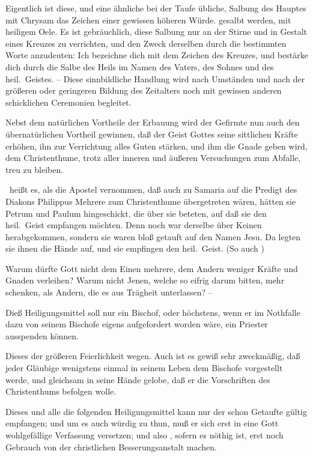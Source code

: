 \begin{aufza}
{	Eigentlich ist diese, und eine ähnliche bei der Taufe übliche, Salbung des Hauptes mit Chrysam das Zeichen einer gewissen höheren Würde.}
gesalbt werden, mit heiligem Oele. Es ist gebräuchlich, diese Salbung nur an der Stirne und in Gestalt eines Kreuzes zu verrichten, und den Zweck derselben durch die bestimmten Worte anzudeuten: Ich bezeichne dich mit dem Zeichen des Kreuzes, und bestärke dich durch die Salbe des Heils im Namen des Vaters, des Sohnes und des heil.\ Geistes. -- Diese sinnbildliche Handlung wird nach Umständen und nach der größeren oder geringeren Bildung des Zeitalters noch mit gewissen anderen schicklichen Ceremonien begleitet.
\item Nebst dem natürlichen Vortheile der Erbauung wird der Gefirmte nun auch den übernatürlichen Vortheil gewinnen, daß der Geist Gottes seine sittlichen Kräfte erhöhen, ihn zur Verrichtung alles Guten stärken, und ihm die Gnade geben wird, dem Christenthume, trotz aller inneren und äußeren Versuchungen zum Abfalle, treu zu bleiben.~\par
{}\par
{}\ heißt es, als die Apostel vernommen, daß auch zu Samaria auf die Predigt des Diakons Philippus Mehrere zum Christenthume übergetreten wären, hätten sie Petrum und Paulum hingeschickt, die über sie beteten, auf daß sie den heil.\ Geist empfangen möchten. Denn noch war derselbe über Keinen herabgekommen, sondern sie waren bloß getauft auf den Namen Jesu. Da legten sie ihnen die Hände auf, und sie empfingen den heil.\ Geist. (So auch )\par
{}\par
Warum dürfte Gott nicht dem Einen mehrere, dem Andern weniger Kräfte und Gnaden verleihen? Warum nicht Jenen, welche so eifrig darum bitten, mehr schenken, als Andern, die es aus Trägheit unterlassen? --
\item Dieß Heiligungsmittel soll nur ein Bischof, oder höchstens, wenn er im Nothfalle dazu von seinem Bischofe eigens aufgefordert worden wäre, ein Priester ausspenden können.\par
{}\par
Dieses der größeren Feierlichkeit wegen. Auch ist es gewiß sehr zweckmäßig, daß jeder Gläubige wenigstens einmal in seinem Leben dem Bischofe vorgestellt werde, und gleichsam in seine Hände gelobe, daß er die Vorschriften des Christenthums befolgen wolle.
\item Dieses und alle die folgenden Heiligungsmittel kann nur der schon Getaufte gültig empfangen; und um es auch würdig zu thun, muß er sich erst in eine Gott wohlgefällige Verfassung versetzen; und also \zB , sofern es nöthig ist, erst noch Gebrauch von der christlichen Besserungsanstalt machen.\par

\end{aufza}

